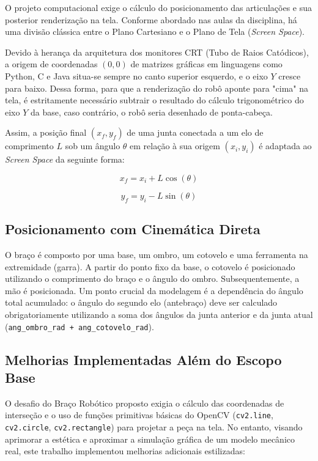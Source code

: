 \documentclass{article}
\begin{document}
O projeto computacional exige o cálculo do posicionamento das articulações e sua posterior renderização na tela. Conforme abordado nas aulas da disciplina, há uma divisão clássica entre o Plano Cartesiano e o Plano de Tela (\textit{Screen Space}).

Devido à herança da arquitetura dos monitores CRT (Tubo de Raios Catódicos), a origem de coordenadas $(0,0)$ de matrizes gráficas em linguagens como Python, C e Java situa-se sempre no canto superior esquerdo, e o eixo $Y$ cresce para baixo. Dessa forma, para que a renderização do robô aponte para "cima" na tela, é estritamente necessário subtrair o resultado do cálculo trigonométrico do eixo $Y$ da base, caso contrário, o robô seria desenhado de ponta-cabeça.

Assim, a posição final $(x_f, y_f)$ de uma junta conectada a um elo de comprimento $L$ sob um ângulo $\theta$ em relação à sua origem $(x_i, y_i)$ é adaptada ao \textit{Screen Space} da seguinte forma:

\begin{equation}\label{eq:cinematica_x}
x_f = x_i + L \cos(\theta)
\end{equation}

\begin{equation}\label{eq:cinematica_y}
y_f = y_i - L \sin(\theta)
\end{equation}

\subsection{Posicionamento com Cinemática Direta}

O braço é composto por uma base, um ombro, um cotovelo e uma ferramenta na extremidade (garra). A partir do ponto fixo da base, o cotovelo é posicionado utilizando o comprimento do braço e o ângulo do ombro. Subsequentemente, a mão é posicionada. Um ponto crucial da modelagem é a dependência do ângulo total acumulado: o ângulo do segundo elo (antebraço) deve ser calculado obrigatoriamente utilizando a soma dos ângulos da junta anterior e da junta atual (\texttt{ang\_ombro\_rad + ang\_cotovelo\_rad}).

\subsection{Melhorias Implementadas Além do Escopo Base}

O desafio do Braço Robótico proposto exigia o cálculo das coordenadas de interseção e o uso de funções primitivas básicas do OpenCV (\texttt{cv2.line}, \texttt{cv2.circle}, \texttt{cv2.rectangle}) para projetar a peça na tela. No entanto, visando aprimorar a estética e aproximar a simulação gráfica de um modelo mecânico real, este trabalho implementou melhorias adicionais estilizadas:
\end{document}
